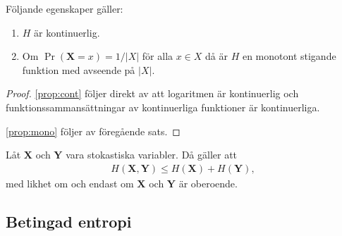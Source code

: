 \documentclass{beamer}
\theoremstyle{definition}
\let\stoch\mathbf{}
\begin{document}
\begin{frame}{\insertsubsectionhead}
  \begin{theorem}
    Följande egenskaper gäller:
    \begin{enumerate}
      \item\label{prop:cont} \(H\) är kontinuerlig.
      \item\label{prop:mono} Om \(\Pr(\stoch X = x) = 1/|X|\) för alla \(x\in 
        X\) då är \(H\) en monotont stigande funktion med avseende på \(|X|\).
    \end{enumerate}
  \end{theorem}

  \begin{proof}
    \cref{prop:cont} följer direkt av att logaritmen är kontinuerlig och 
    funktionssammansättningar av kontinuerliga funktioner är kontinuerliga.

    \cref{prop:mono} följer av föregående sats.
  \end{proof}
\end{frame}

\begin{frame}{\insertsubsectionhead}
  \begin{lemma}
    Låt \(\stoch X\) och \(\stoch Y\) vara stokastiska variabler.
    Då gäller att
    \begin{align*}
      H(\stoch X, \stoch Y)\leq H(\stoch X) + H(\stoch Y),
    \end{align*}
    med likhet om och endast om \(\stoch X\) och \(\stoch Y\) är oberoende.
  \end{lemma}
\end{frame}

%
%

\subsection{Betingad entropi}
\end{document}
